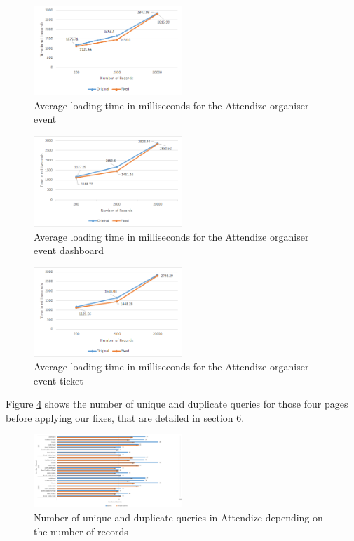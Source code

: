 \documentclass[sigconf]{acmart}
\begin{document}
\begin{figure}[b!]
\includegraphics[width=0.5\textwidth]{attendizeorganiserevent}
\caption{Average loading time in milliseconds for the Attendize organiser event}
\label{attendizeorganiserevent}
\end{figure}
\begin{figure}[b!]
\includegraphics[width=0.5\textwidth]{attendizeorganisereventdashboard}
\caption{Average loading time in milliseconds for the Attendize organiser event dashboard}
\label{attendizeorganisereventdashboard}
\end{figure}
\begin{figure}[b!]
\includegraphics[width=0.5\textwidth]{attendizeorganisereventticket}
\caption{Average loading time in milliseconds for the Attendize organiser event ticket}
\label{attendizeorganisereventticket}
\end{figure}
Figure \ref{attendizequeries} shows the number of unique and duplicate queries for those four pages before applying our fixes, that are detailed in section 6.
\begin{figure}[t!]
\includegraphics[width=0.5\textwidth]{attendizequeries}
\caption{Number of unique and duplicate queries in Attendize depending on the number of records}
\label{attendizequeries}
\end{figure}
\end{document}
